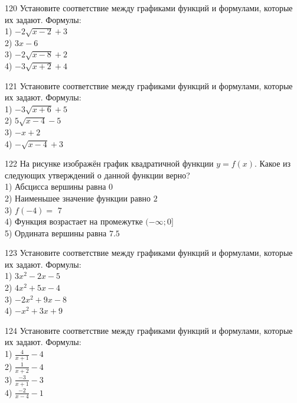 \documentclass[4apaper]{article}
\begin{document}
\begin{taskBN}{120}
Установите соответствие между графиками функций и формулами, которые их задают. Формулы: \\1) $-2\sqrt{x-2}+3$\\2) $3x-6$\\3) $-2\sqrt{x-8}+2$\\4) $-3\sqrt{x+2}+4$
\end{taskBN}

\begin{taskBN}{121}
Установите соответствие между графиками функций и формулами, которые их задают. Формулы: \\1) $-3\sqrt{x+6}+5$\\2) $5\sqrt{x-4}-5$\\3) $-x+2$\\4) $-\sqrt{x-4}+3$
\end{taskBN}

\begin{taskBN}{122}
На рисунке изображён график квадратичной функции $y=f(x)$. Какое из следующих утверждений о данной функции верно?\\1) Абсцисса вершины равна $0$\\2) Наименьшее значение функции равно  $2$\\3) $f(-4)=$ $7$\\4) Функция возрастает на промежутке $(-\infty;0]$\\5) Ордината вершины равна $7.5$
\end{taskBN}

\begin{taskBN}{123}
Установите соответствие между графиками функций и формулами, которые их задают. Формулы: \\1) $3x^2-2x-5$\\2) $4x^2+5x-4$\\3) $-2x^2+9x-8$\\4) $-x^2+3x+9$
\end{taskBN}

\begin{taskBN}{124}
Установите соответствие между графиками функций и формулами, которые их задают. Формулы: \\1) $\frac{4}{x+1}-4$\\2) $\frac{1}{x+2}-4$\\3) $\frac{-3}{x+1}-3$\\4) $\frac{-2}{x-4}-1$
\end{taskBN}
\end{document}
